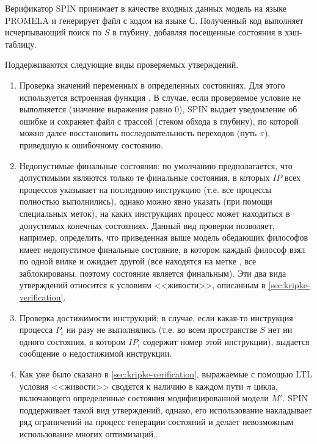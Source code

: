 Верификатор SPIN принимает в качестве входных данных модель на языке PROMELA и генерирует
файл с кодом на языке С. Полученный код выполняет исчерпывающий поиск по $S$ в глубину,
добавляя посещенные состояния в хэш-таблицу.

Поддерживаются следующие виды проверяемых утверждений. 

\begin{enumerate}
\item Проверка значений переменных в определенных состояниях. Для этого используется
  встроенная функция . В случае, если проверяемое условие не выполняется
  (значение выражения равно 0), SPIN выдает уведомление об ошибке и сохраняет файл с
  трассой (стеком обхода в глубину), по которой можно далее восстановить
  последовательность переходов (путь $\pi$), приведшую к ошибочному состоянию.

\item Недопустимые финальные состояния: по умолчанию предполагается, что допустимыми
  являются только те финальные состояния, в которых $IP$ всех процессов указывает на
  последнюю инструкцию (т.е. все процессы полностью выполнились), однако можно явно
  указать (при помощи специальных меток), на каких инструкциях процесс может находиться в
  допустимых конечных состояниях. Данный вид проверки позволяет, например, определить, что
  приведенная выше модель обедающих философов имеет недопустимое финальные состояние, в
  котором каждый философ взял по одной вилке и ожидает другой (все находятся на метке
  , все заблокированы, поэтому состояние является финальным). Эти два вида
  утверждений относится к условиям <<живости>>, описанным в \ref{sec:kripke-verification}.

\item Проверка достижимости инструкций: в случае, если какая-то инструкция процесса $P_i$
  ни разу не выполнялись (т.е. во всем пространстве $S$ нет ни одного состояния, в котором
  $IP_i$ содержит номер этой инструкции), выдается сообщение о недостижимой инструкции.

\item Как уже было сказано в \ref{sec:kripke-verification}, выражаемые с помощью LTL
  условия <<живости>> сводятся к наличию в каждом пути $\pi$ цикла, включающего
  определенные состояния модифицированной модели $M'$. SPIN поддерживает такой вид
  утверждений, однако, его использование накладывает ряд ограничений на процесс генерации
  состояний и делает невозможным использование многих оптимизаций.\cite{SpinRoot}.
\end{enumerate}

